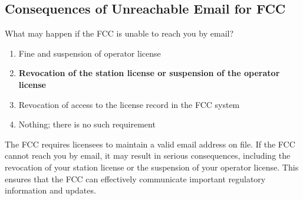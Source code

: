 \subsection{Consequences of Unreachable Email for FCC}
\label{T1C04}

\begin{tcolorbox}[colback=gray!10!white,colframe=black!75!black,title=T1C04]
What may happen if the FCC is unable to reach you by email?
\begin{enumerate}[label=\Alph*),noitemsep]
    \item Fine and suspension of operator license
    \item \textbf{Revocation of the station license or suspension of the operator license}
    \item Revocation of access to the license record in the FCC system
    \item Nothing; there is no such requirement
\end{enumerate}
\end{tcolorbox}

The FCC requires licensees to maintain a valid email address on file. If the FCC cannot reach you by email, it may result in serious consequences, including the revocation of your station license or the suspension of your operator license. This ensures that the FCC can effectively communicate important regulatory information and updates.